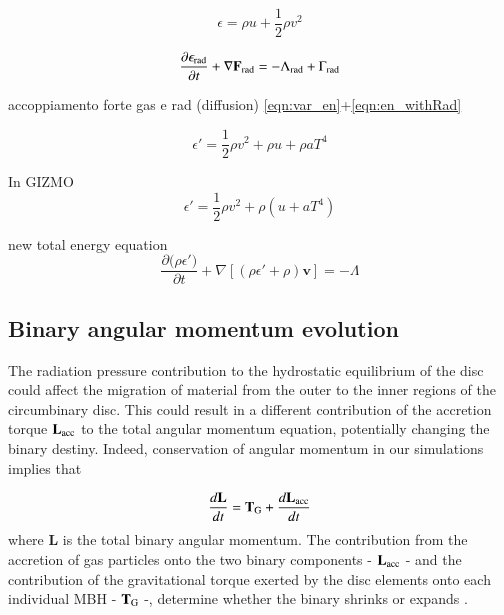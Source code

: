 \documentclass{aa}
\begin{document}
\begin{equation}
    \label{eqn:en}
    \epsilon = \rho u + \frac{1}{2}\rho v^2
\end{equation}

\begin{equation}
    \label{eqn:en_withRad}
    \frac{\partial{\epsilon_{\rm rad}}}{\partial{t}} + \nabla \mathbf{F}_{\rm rad} = - \Lambda_{\rm rad} + \Gamma_{\rm rad}
\end{equation}

accoppiamento forte gas e rad (diffusion)
\ref{eqn:var_en}+\ref{eqn:en_withRad}

\begin{equation}
    \epsilon ' = \frac{1}{2}\rho v^2 +\rho u +\rho a T^4
\end{equation}

In {\sc GIZMO}
\begin{equation}
    \epsilon ' = \frac{1}{2}\rho v^2 +\rho (u +a T^4)
\end{equation}

new total energy equation 
\begin{equation}
    \label{eqn:var_en_new}
    \frac{\partial{(\rho \epsilon '})}{\partial{t}} + \nabla[(\rho \epsilon' + \rho)\mathbf{v}] = - \Lambda
\end{equation}

\subsection{Binary angular momentum evolution}
The radiation pressure contribution to the hydrostatic equilibrium of the disc could affect the migration of material from the outer to the inner regions of the circumbinary disc. This could result in a different contribution of the accretion torque $\mathbf{L_{\rm acc}}$ to the total angular momentum equation, potentially changing the binary destiny. Indeed, conservation of angular momentum in our simulations implies that 

\begin{equation}
    \frac{d \mathbf{L}}{dt}=\mathbf{T}_{\rm G} + \frac{d \mathbf{L_{\rm acc}}}{dt}
\end{equation}
where $\mathbf{L}$ is the total binary angular momentum. The contribution from the accretion of gas particles onto the two binary components - $\mathbf{L_{\rm acc}}$ - and the contribution of the gravitational torque exerted by the disc elements onto each individual MBH - $\mathbf{T}_{\rm G}$ -, determine whether the binary shrinks or expands \citep{roedig2012}. 
\end{document}
